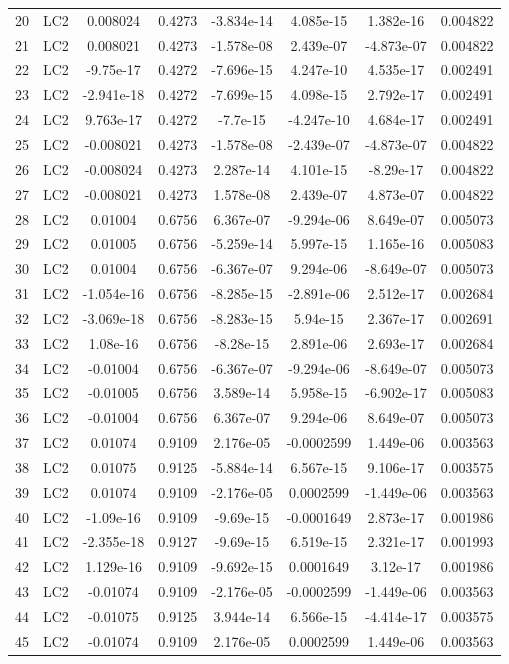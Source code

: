\documentclass{article}%
\begin{document}
\begin{longtable}{| c c | c c c c c c |}
20&LC2&0.008024&0.4273&{-}3.834e{-}14&4.085e{-}15&1.382e{-}16&0.004822\\%
21&LC2&0.008021&0.4273&{-}1.578e{-}08&2.439e{-}07&{-}4.873e{-}07&0.004822\\%
22&LC2&{-}9.75e{-}17&0.4272&{-}7.696e{-}15&4.247e{-}10&4.535e{-}17&0.002491\\%
23&LC2&{-}2.941e{-}18&0.4272&{-}7.699e{-}15&4.098e{-}15&2.792e{-}17&0.002491\\%
24&LC2&9.763e{-}17&0.4272&{-}7.7e{-}15&{-}4.247e{-}10&4.684e{-}17&0.002491\\%
25&LC2&{-}0.008021&0.4273&{-}1.578e{-}08&{-}2.439e{-}07&{-}4.873e{-}07&0.004822\\%
26&LC2&{-}0.008024&0.4273&2.287e{-}14&4.101e{-}15&{-}8.29e{-}17&0.004822\\%
27&LC2&{-}0.008021&0.4273&1.578e{-}08&2.439e{-}07&4.873e{-}07&0.004822\\%
28&LC2&0.01004&0.6756&6.367e{-}07&{-}9.294e{-}06&8.649e{-}07&0.005073\\%
29&LC2&0.01005&0.6756&{-}5.259e{-}14&5.997e{-}15&1.165e{-}16&0.005083\\%
30&LC2&0.01004&0.6756&{-}6.367e{-}07&9.294e{-}06&{-}8.649e{-}07&0.005073\\%
31&LC2&{-}1.054e{-}16&0.6756&{-}8.285e{-}15&{-}2.891e{-}06&2.512e{-}17&0.002684\\%
32&LC2&{-}3.069e{-}18&0.6756&{-}8.283e{-}15&5.94e{-}15&2.367e{-}17&0.002691\\%
33&LC2&1.08e{-}16&0.6756&{-}8.28e{-}15&2.891e{-}06&2.693e{-}17&0.002684\\%
34&LC2&{-}0.01004&0.6756&{-}6.367e{-}07&{-}9.294e{-}06&{-}8.649e{-}07&0.005073\\%
35&LC2&{-}0.01005&0.6756&3.589e{-}14&5.958e{-}15&{-}6.902e{-}17&0.005083\\%
36&LC2&{-}0.01004&0.6756&6.367e{-}07&9.294e{-}06&8.649e{-}07&0.005073\\%
37&LC2&0.01074&0.9109&2.176e{-}05&{-}0.0002599&1.449e{-}06&0.003563\\%
38&LC2&0.01075&0.9125&{-}5.884e{-}14&6.567e{-}15&9.106e{-}17&0.003575\\%
39&LC2&0.01074&0.9109&{-}2.176e{-}05&0.0002599&{-}1.449e{-}06&0.003563\\%
40&LC2&{-}1.09e{-}16&0.9109&{-}9.69e{-}15&{-}0.0001649&2.873e{-}17&0.001986\\%
41&LC2&{-}2.355e{-}18&0.9127&{-}9.69e{-}15&6.519e{-}15&2.321e{-}17&0.001993\\%
42&LC2&1.129e{-}16&0.9109&{-}9.692e{-}15&0.0001649&3.12e{-}17&0.001986\\%
43&LC2&{-}0.01074&0.9109&{-}2.176e{-}05&{-}0.0002599&{-}1.449e{-}06&0.003563\\%
44&LC2&{-}0.01075&0.9125&3.944e{-}14&6.566e{-}15&{-}4.414e{-}17&0.003575\\%
45&LC2&{-}0.01074&0.9109&2.176e{-}05&0.0002599&1.449e{-}06&0.003563\\%
\end{longtable}%
\end{document}
